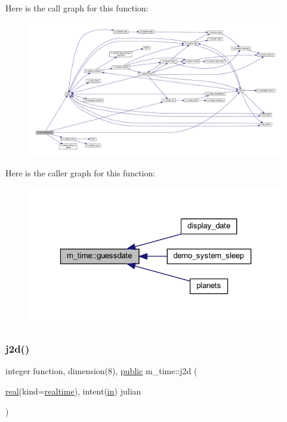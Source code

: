 \begin{DoxyVerb}
Here is the call graph for this function\+:
\nopagebreak
\begin{figure}[H]
\begin{center}
\leavevmode
\includegraphics[width=350pt]{namespacem__time_aa5198c7aa4f3d8411c8ce93046ce3794_cgraph}
\end{center}
\end{figure}
Here is the caller graph for this function\+:
\nopagebreak
\begin{figure}[H]
\begin{center}
\leavevmode
\includegraphics[width=323pt]{namespacem__time_aa5198c7aa4f3d8411c8ce93046ce3794_icgraph}
\end{center}
\end{figure}
\mbox{\label{namespacem__time_a3ad5cad6df02c53e0429c3602a072e3c}} 
\subsubsection{\texorpdfstring{j2d()}{j2d()}}
{\footnotesize\ttfamily integer function, dimension(8), \hyperlink{M__stopwatch_83_8txt_a2f74811300c361e53b430611a7d1769f}{public} m\+\_\+time\+::j2d (\begin{DoxyParamCaption}\item[{\hyperlink{read__watch_83_8txt_abdb62bde002f38ef75f810d3a905a823}{real}(kind=\hyperlink{namespacem__time_ac10ea9e8d59ec74eaa7d89f2517d7422}{realtime}), intent(\hyperlink{M__journal_83_8txt_afce72651d1eed785a2132bee863b2f38}{in})}]{julian }\end{DoxyParamCaption})}




\end{DoxyVerb}
